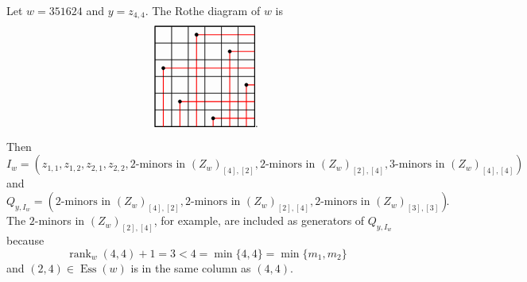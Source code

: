 \documentclass[ALCO,Unicode,published]{cedram}
\DeclareMathOperator{\Ess}{Ess}
\DeclareMathOperator{\rank}{rank}
\begin{document}
\begin{example}
Let $w = 351624$ and $y = z_{4,4}$.  The Rothe diagram of $w$ is \[
  \begin{tikzpicture}[x=1.5em,y=1.5em]
      \draw[color=black, thick](0,1)rectangle(6,7);
      \draw[color=black](1,4)rectangle(2,5);
      \draw[color=black](3,4)rectangle(4,5);
       \draw[color=black](1,3)rectangle(2,4);
      \draw[color=black](3,3)rectangle(4,4);
      \draw[color=black](1,2)rectangle(2,3);
      \draw[color=black](0,1)rectangle(1,2);  
     \draw[thick,color=red] (6,6.5)--(2.5,6.5)--(2.5,1);      
     \draw[thick,color=red] (6,5.5)--(4.5,5.5)--(4.5,1);
     \draw[thick,color=red] (6,4.5)--(0.5,4.5)--(0.5,1);
     \draw[thick,color=red] (6,3.5)--(5.5,3.5)--(5.5,1);
     \draw[thick,color=red] (6,2.5)--(1.5,2.5)--(1.5,1);
     \draw[thick,color=red] (6,1.5)--(3.5,1.5)--(3.5,1);
     \filldraw [black](0.5,4.5)circle(.1);
      \filldraw [black](5.5,3.5)circle(.1);
     \filldraw [black](4.5,5.5)circle(.1);
     \filldraw [black](3.5,1.5)circle(.1);
      \filldraw [black](1.5,2.5)circle(.1);
      \filldraw [black](2.5,6.5)circle(.1);
      \draw[color=black](0,6)rectangle(1,7);
      \draw[color=black](1,6)rectangle(2,7);  
      \draw[color=black](2,6)rectangle(3,7);
      \draw[color=black](3,6)rectangle(4,7); 
      \draw[color=black](4,6)rectangle(5,7);
      \draw[color=black](5,6)rectangle(6,7);
      \draw[color=black](0,5)rectangle(1,6);
      \draw[color=black](1,5)rectangle(2,6);  
      \draw[color=black](2,5)rectangle(3,6);
      \draw[color=black](3,5)rectangle(4,6); 
      \draw[color=black](4,5)rectangle(5,6);
      \draw[color=black](5,5)rectangle(6,6);
     \draw[color=black](0,4)rectangle(1,5); 
      \draw[color=black](2,4)rectangle(3,5);
      \draw[color=black](4,4)rectangle(5,5);
      \draw[color=black](5,4)rectangle(6,5);
      \draw[color=black](0,3)rectangle(1,4); 
      \draw[color=black](2,3)rectangle(3,4);
      \draw[color=black](4,3)rectangle(5,4);
      \draw[color=black](5,3)rectangle(6,4);
      \draw[color=black](0,2)rectangle(1,3); 
      \draw[color=black](2,2)rectangle(3,3);
      \draw[color=black](3,2)rectangle(4,3);
      \draw[color=black](4,2)rectangle(5,3);
      \draw[color=black](5,2)rectangle(6,3);
      \draw[color=black](1,1)rectangle(2,2);  
      \draw[color=black](2,1)rectangle(3,2);
      \draw[color=black](3,1)rectangle(4,2); 
      \draw[color=black](4,1)rectangle(5,2);
      \draw[color=black](5,1)rectangle(6,2);
     \end{tikzpicture}.
\] 
Then \[
I_w = (z_{1,1}, z_{1,2}, z_{2,1}, z_{2,2}, 2\text{-minors in } (Z_w)_{[4],[2]},  2\text{-minors in } (Z_w)_{[2],[4]}, 3\text{-minors in } (Z_w)_{[4],[4]})
\] and  \[
Q_{y,I_w} = (2\text{-minors in } (Z_w)_{[4],[2]},  2\text{-minors in } (Z_w)_{[2],[4]}, 2\text{-minors in } (Z_w)_{[3],[3]}).
\] The $2$-minors in $(Z_w)_{[2],[4]}$, for example, are included as generators of $Q_{y,I_w}$ because \[
\rank_w(4,4)+1 = 3<4 = \min\{4,4\} = \min\{m_1,m_2\}
\] and $(2,4) \in \Ess(w)$ is in the same column as $(4,4)$.  
\end{example}
\end{document}
